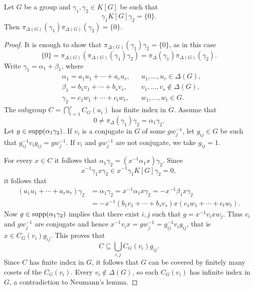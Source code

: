 	

\begin{lemma}[Passman]
	\label{lem:Passman}
	Let $G$ be a group and $\gamma_1,\gamma_2\in K[G]$ be such that 
  \[ 
    \gamma_1K[G]\gamma_2=\{0\}.
  \]
	Then $\pi_{\Delta(G)}(\gamma_1)\pi_{\Delta(G)}(\gamma_2)=\{0\}$.
\end{lemma}

\begin{proof}
	It is enough to show that $\pi_{\Delta(G)}(\gamma_1)\gamma_2=\{0\}$, 
	as in this case
	\[
		\{0\}=\pi_{\Delta(G)}(\pi_{\Delta(G)}(\gamma_1)\gamma_2)=\pi_{\Delta}(\gamma_1)\pi_{\Delta(G)}(\gamma_2).
	\]
	Write $\gamma_1=\alpha_1+\beta_1$, where 
	\begin{align*}
		&\alpha_1=a_1u_1+\cdots+a_ru_r, && u_1,\dots,u_r\in\Delta(G),\\
		&\beta_1=b_1v_1+\cdots+b_sv_s, && v_1,\dots,v_s\not\in\Delta(G),\\
		&\gamma_2=c_1w_1+\cdots+c_tw_t,&& w_1,\dots,w_t\in G.
	\end{align*}
	The subgroup $C=\bigcap_{i=1}^rC_G(u_i)$ has finite index in $G$.
	Assume that 
	\[
		0\ne \pi_{\Delta}(\gamma_1)\gamma_2=\alpha_1\gamma_2. 
	\]
	Let $g\in\operatorname{supp}(\alpha_1\gamma_2)$. 
	If $v_i$ is a conjugate in $G$ of some 
	$gw_j^{-1}$, let $g_{ij}\in G$ be such that
	$g_{ij}^{-1}v_ig_{ij}=gw_j^{-1}$. If $v_i$ and $gw_j^{-1}$ 
	are not conjugate, 
	we take $g_{ij}=1$. 

	For every $x\in C$ it follows that
	$\alpha_1\gamma_2=(x^{-1}\alpha_1x)\gamma_2$. Since  
	\[
		x^{-1}\gamma_1x\gamma_2\in x^{-1}\gamma_1K[G]\gamma_2=0,
	\]
	it follows that
	\begin{align*}
		(a_1u_1+\cdots+a_ru_r)\gamma_2&=
		\alpha_1\gamma_2=x^{-1}\alpha_1x\gamma_2=-x^{-1}\beta_1x\gamma_2\\
		&=-x^{-1}(b_1v_1+\cdots+b_sv_s)x(c_1w_1+\cdots+c_tw_t).
	\end{align*}
	Now $g\in\operatorname{supp}(\alpha_1\gamma_2)$ implies that there exist $i,j$ such that
	$g=x^{-1}v_ixw_j$.
	Thus $v_i$ and $gw_j^{-1}$ are conjugate and hence
	$x^{-1}v_ix=gw_j^{-1}=g_{ij}^{-1}v_ig_{ij}$, that is
	$x\in C_G(v_i)g_{ij}$. This proves that 
	\[
		C\subseteq\bigcup_{i,j}C_G(v_i)g_{ij}. 
	\]
	Since $C$ has finite index in $G$, it follows that 
	$G$ can be covered by finitely many cosets of 
	the $C_G(v_i)$. Every $v_i\not\in\Delta(G)$, so 
	each $C_G(v_i)$ has infinite index in $G$, a contradiction 
	to Neumann's lemma.
\end{proof}


